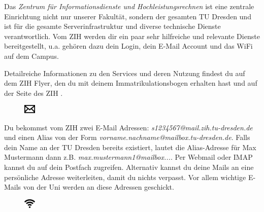 
Das \textit{Zentrum für Informationsdienste und Hochleistungsrechnen} ist eine zentrale Einrichtung nicht nur unserer Fakultät, sondern der gesamten TU Dresden und ist für die gesamte Serverinfrastruktur und diverse technische Dienste verantwortlich. Vom ZIH werden dir ein paar sehr hilfreiche und relevante Dienste bereitgestellt, u.a. gehören dazu dein Login, dein E-Mail Account und das WiFi auf dem Campus.

Detailreiche Informationen zu den Services und deren Nutzung findest du auf dem ZIH Flyer, den du mit deinem Immatrikulationsbogen erhalten hast und auf der Seite des ZIH .

\begin{figure}
  \vspace{-14pt}
  \begin{centering}
    \includegraphics[width=0.05\textwidth]{img/icons/email.pdf}
  \end{centering}
  \vspace{-20pt}
\end{figure}

Du bekommst vom ZIH zwei E-Mail Adressen:
\textit{s1234567@mail.zih.tu-dresden.de} und einen Alias von der Form \textit{vorname.nachname@mailbox.tu-dresden.de}.
Falls dein Name an der TU Dresden bereits existiert, lautet die Alias-Adresse für Max Mustermann dann z.B. \textit{max.mustermann1@mailbox...}.
Per Webmail oder IMAP kannst du auf dein Postfach zugreifen.
Alternativ kannst du deine Mails an eine persönliche Adresse weiterleiten, damit du nichts verpasst.
Vor allem wichtige E-Mails von der Uni werden an diese Adressen geschickt.


\begin{figure}
  \vspace{-14pt}
  \begin{centering}
    \includegraphics[width=0.05\textwidth]{img/icons/wifi.pdf}
  \end{centering}
  \vspace{-20pt}
\end{figure}

